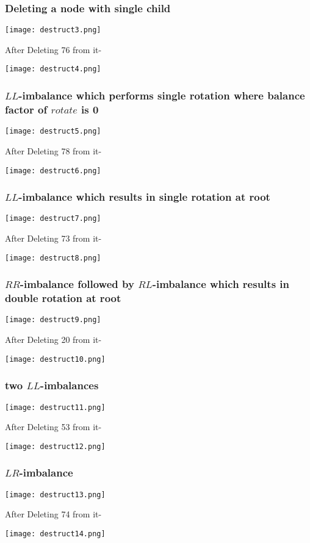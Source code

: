 \documentclass{article}
\begin{document}
\subsubsection{Deleting a node with single child}
\begin{center}
\texttt{[image: destruct3.png]}
\end{center}
After Deleting 76 from it-
\begin{center}
\texttt{[image: destruct4.png]}
\end{center}

\subsubsection{$LL$-imbalance which performs single rotation where balance factor of $rotate$ is 0}
\begin{center}
\texttt{[image: destruct5.png]}
\end{center}
After Deleting 78 from it-
\begin{center}
\texttt{[image: destruct6.png]}
\end{center}

\subsubsection{$LL$-imbalance which results in single rotation at root}
\begin{center}
\texttt{[image: destruct7.png]}
\end{center}
After Deleting 73 from it-
\begin{center}
\texttt{[image: destruct8.png]}
\end{center}

\subsubsection{$RR$-imbalance followed by $RL$-imbalance which results in double rotation at root}
\begin{center}
\texttt{[image: destruct9.png]}
\end{center}
After Deleting 20 from it-
\begin{center}
\texttt{[image: destruct10.png]}
\end{center}

\subsubsection{two $LL$-imbalances}
\begin{center}
\texttt{[image: destruct11.png]}
\end{center}
After Deleting 53 from it-
\begin{center}
\texttt{[image: destruct12.png]}
\end{center}

\subsubsection{$LR$-imbalance}
\begin{center}
\texttt{[image: destruct13.png]}
\end{center}
After Deleting 74 from it-
\begin{center}
\texttt{[image: destruct14.png]}
\end{center}
\end{document}
